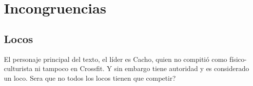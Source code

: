 \section{Incongruencias}\label{incongruencias}

\subsection{Locos}\label{locos}

El personaje principal del texto, el líder es Cacho, quien no compitió
como físico-culturista ni tampoco en Crossfit. Y sin embargo tiene
autoridad y es considerado un loco. Sera que no todos los locos tienen
que competir?
